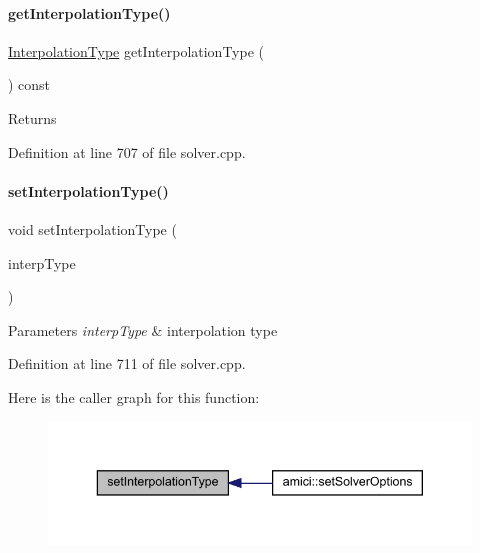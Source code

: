 \paragraph{\texorpdfstring{get\+Interpolation\+Type()}{getInterpolationType()}}
{\footnotesize\ttfamily \mbox{\hyperlink{namespaceamici_a8472f01c511d77bbfb981a46618ea1ea}{Interpolation\+Type}} get\+Interpolation\+Type (\begin{DoxyParamCaption}{ }\end{DoxyParamCaption}) const}

\begin{DoxyReturn}{Returns}

\end{DoxyReturn}


Definition at line 707 of file solver.\+cpp.

\mbox{\label{classamici_1_1_solver_a9d9a0a5f8cdfdb993960706c646e240f}} 
\paragraph{\texorpdfstring{set\+Interpolation\+Type()}{setInterpolationType()}}
{\footnotesize\ttfamily void set\+Interpolation\+Type (\begin{DoxyParamCaption}\item[{\mbox{\hyperlink{namespaceamici_a8472f01c511d77bbfb981a46618ea1ea}{Interpolation\+Type}}}]{interp\+Type }\end{DoxyParamCaption})}


\begin{DoxyParams}{Parameters}
{\em interp\+Type} & interpolation type \\
\hline
\end{DoxyParams}


Definition at line 711 of file solver.\+cpp.

Here is the caller graph for this function\+:
\nopagebreak
\begin{figure}[H]
\begin{center}
\leavevmode
\includegraphics[width=343pt]{classamici_1_1_solver_a9d9a0a5f8cdfdb993960706c646e240f_icgraph}
\end{center}
\end{figure}
\mbox{\label{classamici_1_1_solver_ac758cf7c51f50db18ea58898623ce12c}} 
